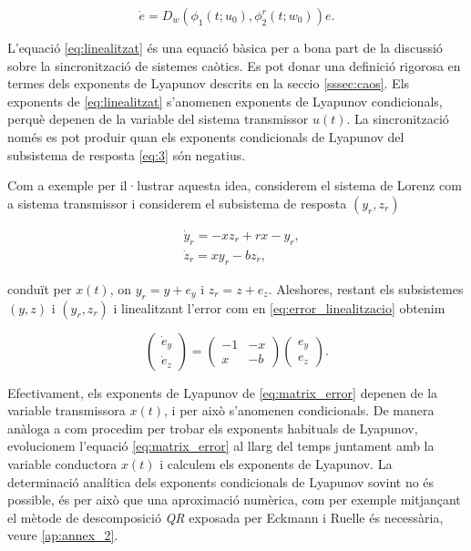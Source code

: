 \documentclass[11pt,a4paper,openright,oneside]{article}
\numberwithin{equation}{section}
\theoremstyle{definition}
\begin{document}
\begin{equation} \label{eq:linealitzat}
    \dot{e} = D_w\left(\phi_1(t; u_0), \phi_2^r(t; w_0)\right)e.
\end{equation}

L'equació \eqref{eq:linealitzat} és una equació bàsica per a bona part de la discussió sobre la sincronització de sistemes caòtics.  Es pot donar una definició rigorosa en termes dels exponents de Lyapunov descrits en la seccio \ref{sssec:caos}. Els exponents de \eqref{eq:linealitzat} s'anomenen exponents de Lyapunov condicionals, perquè depenen de la variable del sistema transmissor $u(t)$. La sincronització només es pot produir quan els exponents condicionals de Lyapunov del subsistema de resposta \eqref{eq:3} són negatius.

Com a exemple per il·lustrar aquesta idea,  considerem el sistema de Lorenz com a sistema transmissor i considerem el subsistema de resposta $(y_r, z_r)$ 

\begin{equation*} \begin{aligned}
    &\dot{y}_r=-xz_r+rx-y_r, \\ 
    &\dot{z}_r=xy_r-bz_r,
\end{aligned} \end{equation*}

conduït per $x(t)$, on $y_r=y+e_y$ i $z_r=z+e_z$. Aleshores, restant els subsistemes $(y,z)$ i $(y_r,z_r)$ i linealitzant l'error com en \eqref{eq:error_linealitzacio} obtenim

\begin{equation} \label{eq:matrix_error} \begin{pmatrix}
        \dot{e}_y \\
        \dot{e}_z   
\end{pmatrix}
=
\begin{pmatrix}
    -1 &-x\\
    x &-b
\end{pmatrix}
\begin{pmatrix}
        e_y \\
        e_z   
\end{pmatrix}.
\end{equation} 

Efectivament, els exponents de Lyapunov de \eqref{eq:matrix_error} depenen de la variable transmissora $x(t)$, i per això s'anomenen condicionals. De manera anàloga a com procedim per trobar els exponents habituals de Lyapunov, evolucionem l'equació \eqref{eq:matrix_error} al llarg del temps juntament amb la variable conductora $x(t)$ i calculem els exponents de Lyapunov. La determinació analítica dels exponents condicionals de Lyapunov sovint no és possible, és per això que una aproximació numèrica, com per exemple mitjançant el mètode de descomposició \textit{QR} exposada per Eckmann i Ruelle \cite{Eckmann} és necessària, veure \ref{ap:annex_2}. 
\end{document}
